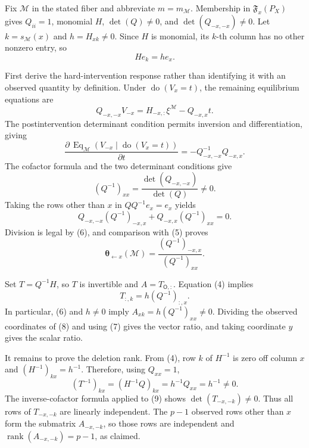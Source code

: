Fix \(\mathcal M\) in the stated fiber and abbreviate \(m=m_{\mathcal M}\). Membership in \(\mathfrak F_x(P_X)\) gives \(Q_{ii}=1\), monomial \(H\), \(\det(Q)\ne0\), and \(\det(Q_{-x,-x})\ne0\). Let \(k=s_{\mathcal M}(x)\) and \(h=H_{xk}\ne0\). Since \(H\) is monomial, its \(k\)-th column has no other nonzero entry, so
\[
 He_k=h e_x. \tag{4}
\]

First derive the hard-intervention response rather than identifying it with an observed quantity by definition. Under \(\operatorname{do}(V_x=t)\), the remaining equilibrium equations are
\[
 Q_{-x,-x}V_{-x}=H_{-x,:}\xi^{\mathcal M}-Q_{-x,x}t.
\]
The postintervention determinant condition permits inversion and differentiation, giving
\[
 \frac{\partial\,\operatorname{Eq}_{\mathcal M}(V_{-x}\mid\operatorname{do}(V_x=t))}{\partial t}
 =-Q_{-x,-x}^{-1}Q_{-x,x}. \tag{5}
\]
The cofactor formula and the two determinant conditions give
\[
 (Q^{-1})_{xx}=\frac{\det(Q_{-x,-x})}{\det(Q)}\ne0. \tag{6}
\]
Taking the rows other than \(x\) in \(QQ^{-1}e_x=e_x\) yields
\[
 Q_{-x,-x}(Q^{-1})_{-x,x}+Q_{-x,x}(Q^{-1})_{xx}=0.
\]
Division is legal by (6), and comparison with (5) proves
\[
 \boldsymbol\theta_{\leftarrow x}(\mathcal M)
 =\frac{(Q^{-1})_{-x,x}}{(Q^{-1})_{xx}}. \tag{7}
\]

Set \(T=Q^{-1}H\), so \(T\) is invertible and \(A=T_{\mathsf O,:}\). Equation (4) implies
\[
 T_{:,k}=h(Q^{-1})_{:,x}. \tag{8}
\]
In particular, (6) and \(h\ne0\) imply \(A_{xk}=h(Q^{-1})_{xx}\ne0\). Dividing the observed coordinates of (8) and using (7) gives the vector ratio, and taking coordinate \(y\) gives the scalar ratio.

It remains to prove the deletion rank. From (4), row \(k\) of \(H^{-1}\) is zero off column \(x\) and \((H^{-1})_{kx}=h^{-1}\). Therefore, using \(Q_{xx}=1\),
\[
 (T^{-1})_{kx}=(H^{-1}Q)_{kx}=h^{-1}Q_{xx}=h^{-1}\ne0. \tag{9}
\]
The inverse-cofactor formula applied to (9) shows \(\det(T_{-x,-k})\ne0\). Thus all rows of \(T_{-x,-k}\) are linearly independent. The \(p-1\) observed rows other than \(x\) form the submatrix \(A_{-x,-k}\), so those rows are independent and \(\operatorname{rank}(A_{-x,-k})=p-1\), as claimed.